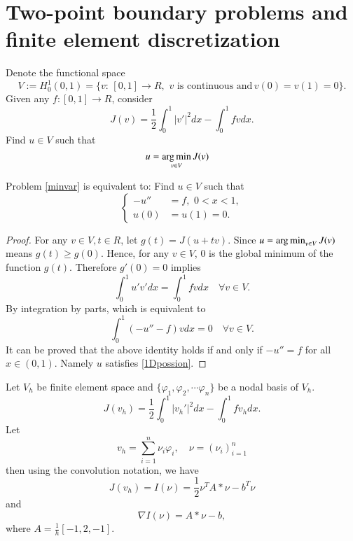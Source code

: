 \section{Two-point boundary problems and finite element discretization}
Denote the functional space
$$
V:=H^1_0(0,1)=\{v:\, [0,1]\rightarrow R,\,\,\mbox{$v$ is continuous and}\, v(0)=v(1)=0\}.
$$
Given any $f: [0,1]\rightarrow R$, consider 
\begin{equation*}
J(v)=\frac12\int_{0}^1|v'|^2dx-\int_{0}^1 fvdx.
\end{equation*}
Find $u\in V$ such that 
\begin{equation}\label{minvar}
\displaystyle u=\operatorname*{arg\,min}_{v\in V} J(v)\quad
\end{equation}
\begin{theorem}
Problem \eqref{minvar} is equivalent to: Find $u\in V$ such that 
\begin{equation}\label{1Dpossion}
\left\{
\begin{aligned}
-u''&= f, \,\, 0<x<1, \\
 u(0)&=u(1)=0.
\end{aligned}
\right.
\end{equation}
\end{theorem}
\begin{proof}
For any $v\in V, t\in R$, let $g(t)=J(u+t v)$. 
Since $u=\operatorname*{arg\,min}_{v\in V} J(v)$ means $g(t)\ge g(0)$. Hence, for any $v\in V$, $0$ is the global minimum of the function $g(t)$. Therefore
$g'(0)=0$ implies 
$$
\int_{0}^1 u'v'dx=\int_0^1fvdx\quad \forall v\in V. 
$$
By integration by parts, which is equivalent to 
$$
\int_{0}^1 (-u''-f)vdx=0\quad \forall v\in V. 
$$
It can be proved that the above identity holds if and only if 
$-u''= f$ for all $x\in (0,1)$. Namely $u$ satisfies \eqref{1Dpossion}. 
\end{proof}

Let $V_h$ be finite element space and $\{\varphi_1, \varphi_2, \cdots \varphi_{n}\}$ be a nodal basis of $V_h$. 
\begin{equation}
J(v_h)=\frac12\int_0^1|v_h'|^2dx-\int_0^1fv_hdx.
\end{equation}
Let 
$$
\displaystyle v_h=\sum_{i=1}^{n}\nu_i\varphi_i,\quad \nu=(\nu_i)_{i=1}^{n}
$$
then using the convolution notation, we have
$$
J(v_h)=I(\nu)=\frac12\nu^TA\ast\nu-b^T\nu
$$
and 
$$
\nabla I(\nu) =A\ast \nu -b,
$$
where $A=\frac{1}{h}[-1,2, -1]$.


